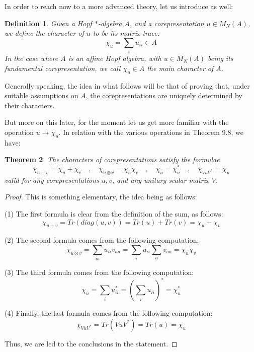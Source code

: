 \documentclass[12pt]{amsbook}
\newtheorem{theorem}{Theorem}[chapter]
\newtheorem{definition}[theorem]{Definition}
\begin{document}
In order to reach now to a more advanced theory, let us introduce as well:


\begin{definition}
Given a Hopf $*$-algebra $A$, and a corepresentation $u\in M_N(A)$, we define the character of $u$ to be its matrix trace:
$$\chi_u=\sum_iu_{ii}\in A$$
In the case where $A$ is an affine Hopf algebra, with $u\in M_N(A)$ being its fundamental corepresentation, we call $\chi_u\in A$ the main character of $A$. 
\end{definition}

Generally speaking, the idea in what follows will be that of proving that, under suitable assumptions on $A$, the corepresentations are uniquely determined by their characters. 

\bigskip

But more on this later, for the moment let us get more familiar with the operation $u\to\chi_u$. In relation with the various operations in Theorem 9.8, we have:


\begin{theorem}
The characters of corepresentations satisfy the formulae
$$\chi_{u+v}=\chi_u+\chi_v\quad,\quad
\chi_{u\otimes v}=\chi_u\chi_v\quad,\quad
\chi_{\bar{u}}=\chi_u^*\quad,\quad 
\chi_{VuV^*}=\chi_u$$
valid for any corepresentations $u,v$, and any unitary scalar matrix $V$. 
\end{theorem}

\begin{proof}
This is something elementary, the idea being as follows:

\medskip

(1) The first formula is clear from the definition of the sum, as follows:
$$\chi_{u+v}
=Tr(diag(u,v))
=Tr(u)+Tr(v)
=\chi_u+\chi_v$$

(2) The second formula comes from the following computation:
$$\chi_{u\otimes v}
=\sum_{ia}u_{ii}v_{aa}
=\sum_iu_{ii}\sum_av_{aa}
=\chi_u\chi_v$$

(3) The third formula comes from the following computation:
$$\chi_{\bar{u}}
=\sum_iu_{ii}^*
=\left(\sum_iu_{ii}\right)^*
=\chi_u^*$$

(4) Finally, the last formula comes from the following computation:
$$\chi_{VuV^*}
=Tr(VuV^*)
=Tr(u)
=\chi_u$$

Thus, we are led to the conclusions in the statement.
\end{proof}
\end{document}
